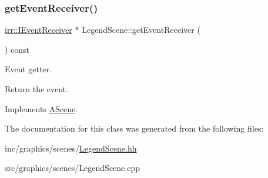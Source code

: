 \subsubsection{\texorpdfstring{get\+Event\+Receiver()}{getEventReceiver()}}
{\footnotesize\ttfamily \hyperlink{classirr_1_1IEventReceiver}{irr\+::\+I\+Event\+Receiver} $\ast$ Legend\+Scene\+::get\+Event\+Receiver (\begin{DoxyParamCaption}{ }\end{DoxyParamCaption}) const\hspace{0.3cm}{\ttfamily [virtual]}}



Event getter. 

Return the event. 

Implements \hyperlink{classAScene_af521e5e6d30a5d2e5d30eb333e4d3abd}{A\+Scene}.



The documentation for this class was generated from the following files\+:\begin{DoxyCompactItemize}
\item 
inc/graphics/scenes/\hyperlink{LegendScene_8hh}{Legend\+Scene.\+hh}\item 
src/graphics/scenes/Legend\+Scene.\+cpp\end{DoxyCompactItemize}

